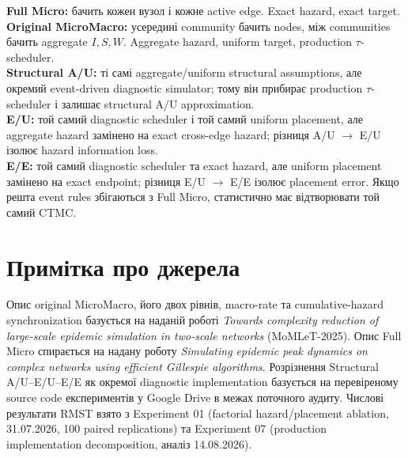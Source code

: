 \documentclass[11pt,a4paper]{article}
\begin{document}
\begin{tcolorbox}[colback=soft,colframe=dark]
\textbf{Full Micro:} бачить кожен вузол і кожне active edge. Exact hazard, exact target.\\[3pt]
\textbf{Original MicroMacro:} усередині community бачить nodes, між communities бачить aggregate $I,S,W$. Aggregate hazard, uniform target, production $\tau$-scheduler.\\[3pt]
\textbf{Structural A/U:} ті самі aggregate/uniform structural assumptions, але окремий event-driven diagnostic simulator; тому він прибирає production $\tau$-scheduler і залишає structural A/U approximation.\\[3pt]
\textbf{E/U:} той самий diagnostic scheduler і той самий uniform placement, але aggregate hazard замінено на exact cross-edge hazard; різниця A/U $\to$ E/U ізолює hazard information loss.\\[3pt]
\textbf{E/E:} той самий diagnostic scheduler та exact hazard, але uniform placement замінено на exact endpoint; різниця E/U $\to$ E/E ізолює placement error. Якщо решта event rules збігаються з Full Micro, статистично має відтворювати той самий CTMC.
\end{tcolorbox}

\section*{Примітка про джерела}
Опис original MicroMacro, його двох рівнів, macro-rate та cumulative-hazard synchronization базується на наданій роботі \textit{Towards complexity reduction of large-scale epidemic simulation in two-scale networks} (MoMLeT-2025). Опис Full Micro спирається на надану роботу \textit{Simulating epidemic peak dynamics on complex networks using efficient Gillespie algorithms}. Розрізнення Structural A/U--E/U--E/E як окремої diagnostic implementation базується на перевіреному source code експериментів у Google Drive в межах поточного аудиту. Числові результати RMST взято з Experiment 01 (factorial hazard/placement ablation, 31.07.2026, 100 paired replications) та Experiment 07 (production implementation decomposition, аналіз 14.08.2026).
\end{document}
